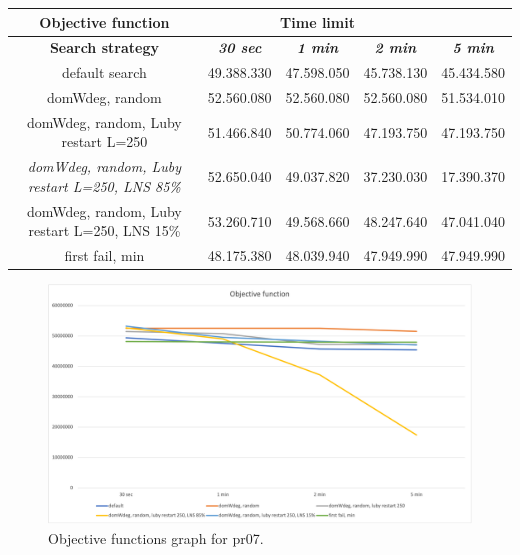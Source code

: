 {
\renewcommand{\arraystretch}{2}
\begin{longtable}[h]{| c | c | c | c | c |}
    \hline
    \textbf{Objective function} & \multicolumn{3}{c}{Time limit} & \\
    \hline
    \textbf{Search strategy} & \textbf{\textit{30 sec}} & \textbf{\textit{1 min}} & \textbf{\textit{2 min}} & \textbf{\textit{5 min}} \\
    \hline
    \endhead
    default search                                         & 49.388.330 & 47.598.050 & 45.738.130 & 45.434.580 \\
    \hline
    domWdeg, random                                        & 52.560.080 & 52.560.080 & 52.560.080 & 51.534.010 \\
    \hline
    domWdeg, random, Luby restart L=250                    & 51.466.840 & 50.774.060 & 47.193.750 & 47.193.750 \\
    \hline
    \textit{domWdeg, random, Luby restart L=250, LNS 85\%} & 52.650.040 & 49.037.820 & 37.230.030 & 17.390.370 \\
    \hline
    domWdeg, random, Luby restart L=250, LNS 15\%          & 53.260.710 & 49.568.660 & 48.247.640 & 47.041.040 \\
    \hline
    first fail, min                                        & 48.175.380 & 48.039.940 & 47.949.990 & 47.949.990 \\
    \hline
\end{longtable}
}
\begin{figure}[H]
    \centering
    \includegraphics[width=1.0\columnwidth]{../graphs/pr07-objf.png}
    \caption{Objective functions graph for pr07.}
\end{figure}

